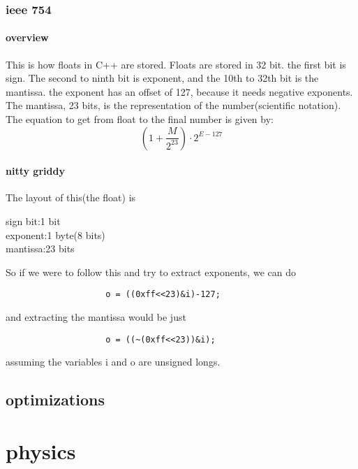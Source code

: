 \documentclass{article} %
\theoremstyle{theorem}
\theoremstyle{definition}
\begin{document}
        \subsubsection{ieee 754}
            \paragraph{overview}
                This is how floats in C++ are stored. Floats are stored in 32 bit. the first bit is sign.
                The second to ninth bit is exponent, and the 10th to 32th bit is the mantissa. the exponent has
                an offset of 127, because it needs negative exponents. The mantissa, 23 bits, is the representation of the number(scientific notation).
                The equation to get from float to the final number is given by:
                \begin{equation}
                    (1+\dfrac{M}{2^{23}})\cdot2^{E-127}
                \end{equation}
            \paragraph{nitty griddy}
                The layout of this(the float) is 
                \begin{center}
                    sign bit:1 bit\\
                    exponent:1 byte(8 bits)\\
                    mantissa:23 bits\\
                \end{center}
                So if we were to follow this and try to extract exponents, we can do
                \begin{verbatim}
                    o = ((0xff<<23)&i)-127;
                \end{verbatim}
                and extracting the mantissa would be just 
                \begin{verbatim}
                    o = ((~(0xff<<23))&i);
                \end{verbatim}
                assuming the variables i and o are unsigned longs.
    \subsection{optimizations}
\section{physics}
\end{document}
